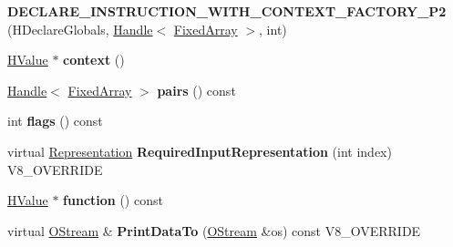 \begin{DoxyCompactItemize}
\item 
\hypertarget{classv8_1_1internal_1_1_v8___f_i_n_a_l_a68e9d7f550b64eede169a1bdc39cf1b8}{}{\bfseries D\+E\+C\+L\+A\+R\+E\+\_\+\+I\+N\+S\+T\+R\+U\+C\+T\+I\+O\+N\+\_\+\+W\+I\+T\+H\+\_\+\+C\+O\+N\+T\+E\+X\+T\+\_\+\+F\+A\+C\+T\+O\+R\+Y\+\_\+\+P2} (H\+Declare\+Globals, \hyperlink{classv8_1_1internal_1_1_handle}{Handle}$<$ \hyperlink{classv8_1_1internal_1_1_fixed_array}{Fixed\+Array} $>$, int)\label{classv8_1_1internal_1_1_v8___f_i_n_a_l_a68e9d7f550b64eede169a1bdc39cf1b8}

\item 
\hypertarget{classv8_1_1internal_1_1_v8___f_i_n_a_l_a911a04b75b22f133c5eb5eafcc2d5f87}{}\hyperlink{classv8_1_1internal_1_1_h_value}{H\+Value} $\ast$ {\bfseries context} ()\label{classv8_1_1internal_1_1_v8___f_i_n_a_l_a911a04b75b22f133c5eb5eafcc2d5f87}

\item 
\hypertarget{classv8_1_1internal_1_1_v8___f_i_n_a_l_a8ddbea806aa3743a33501785894aade8}{}\hyperlink{classv8_1_1internal_1_1_handle}{Handle}$<$ \hyperlink{classv8_1_1internal_1_1_fixed_array}{Fixed\+Array} $>$ {\bfseries pairs} () const \label{classv8_1_1internal_1_1_v8___f_i_n_a_l_a8ddbea806aa3743a33501785894aade8}

\item 
\hypertarget{classv8_1_1internal_1_1_v8___f_i_n_a_l_a4b4bceca64b05428f42454b7fe5b0bcd}{}int {\bfseries flags} () const \label{classv8_1_1internal_1_1_v8___f_i_n_a_l_a4b4bceca64b05428f42454b7fe5b0bcd}

\item 
\hypertarget{classv8_1_1internal_1_1_v8___f_i_n_a_l_a6c6d1f37f40b113d8f4062f1ffff7215}{}virtual \hyperlink{classv8_1_1internal_1_1_representation}{Representation} {\bfseries Required\+Input\+Representation} (int index) V8\+\_\+\+O\+V\+E\+R\+R\+I\+D\+E\label{classv8_1_1internal_1_1_v8___f_i_n_a_l_a6c6d1f37f40b113d8f4062f1ffff7215}

\item 
\hypertarget{classv8_1_1internal_1_1_v8___f_i_n_a_l_ac6cf6a8016ce1ebef76f41f2c27c9086}{}\hyperlink{classv8_1_1internal_1_1_h_value}{H\+Value} $\ast$ {\bfseries function} () const \label{classv8_1_1internal_1_1_v8___f_i_n_a_l_ac6cf6a8016ce1ebef76f41f2c27c9086}

\item 
\hypertarget{classv8_1_1internal_1_1_v8___f_i_n_a_l_ac450dad970b14246be761ccf5004924b}{}virtual \hyperlink{classv8_1_1internal_1_1_o_stream}{O\+Stream} \& {\bfseries Print\+Data\+To} (\hyperlink{classv8_1_1internal_1_1_o_stream}{O\+Stream} \&os) const V8\+\_\+\+O\+V\+E\+R\+R\+I\+D\+E\label{classv8_1_1internal_1_1_v8___f_i_n_a_l_ac450dad970b14246be761ccf5004924b}


\end{DoxyCompactItemize}
